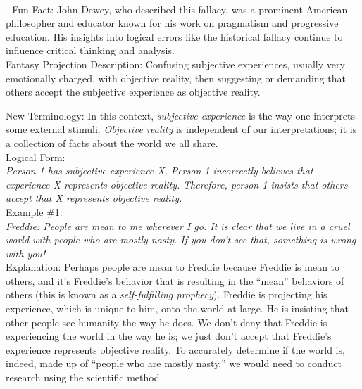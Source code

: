 \documentclass[a4paper,12pt,single,pdftex]{scrbook}
\begin{document}
    
      
    \\

    
      - Fun Fact: John Dewey, who described this fallacy, was a prominent American philosopher and educator known for his work on pragmatism and progressive education. His insights into logical errors like the historical fallacy continue to influence critical thinking and analysis.
    \\

  

Fantasy Projection
    Description: Confusing subjective experiences, usually very emotionally charged, with objective reality, then suggesting or demanding that others accept the subjective experience as objective reality.

    
      New Terminology: In this context, {\em subjective experience}  is the way one interprets some external stimuli. {\em Objective reality}  is independent of our interpretations; it is a collection of facts about the world we all share.
    \\

    
      Logical Form:
    \\

    
      {\em Person 1 has subjective experience X.} \newline
{\em Person 1 incorrectly believes that experience X represents objective reality.} \newline
{\em Therefore, person 1 insists that others accept that X represents objective reality.}
    \\

    
      Example \#1:
    \\

    
      {\em Freddie: People are mean to me wherever I go. It is clear that we live in a cruel world with people who are mostly nasty. If you don’t see that, something is wrong with you!}
    \\

    
      Explanation: Perhaps people are mean to Freddie because Freddie is mean to others, and it’s Freddie’s behavior that is resulting in the “mean” behaviors of others (this is known as a {\em self-fulfilling prophecy}). Freddie is projecting his experience, which is unique to him, onto the world at large. He is insisting that other people see humanity the way he does. We don’t deny that Freddie is experiencing the world in the way he is; we just don’t accept that Freddie’s experience represents objective reality. To accurately determine if the world is, indeed, made up of “people who are mostly nasty,” we would need to conduct research using the scientific method.
    \\
\end{document}

